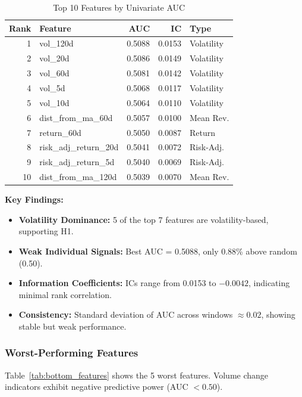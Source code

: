 \documentclass[conference]{IEEEtran}
\begin{document}
\begin{table}[!t]
\caption{Top 10 Features by Univariate AUC}
\label{tab:top_features}
\centering
\begin{tabular}{rlrrl}
\toprule
\textbf{Rank} & \textbf{Feature} & \textbf{AUC} & \textbf{IC} & \textbf{Type} \\
\midrule
1 & vol\_120d & 0.5088 & 0.0153 & Volatility \\
2 & vol\_20d & 0.5086 & 0.0149 & Volatility \\
3 & vol\_60d & 0.5081 & 0.0142 & Volatility \\
4 & vol\_5d & 0.5068 & 0.0117 & Volatility \\
5 & vol\_10d & 0.5064 & 0.0110 & Volatility \\
6 & dist\_from\_ma\_60d & 0.5057 & 0.0100 & Mean Rev. \\
7 & return\_60d & 0.5050 & 0.0087 & Return \\
8 & risk\_adj\_return\_20d & 0.5041 & 0.0072 & Risk-Adj. \\
9 & risk\_adj\_return\_5d & 0.5040 & 0.0069 & Risk-Adj. \\
10 & dist\_from\_ma\_120d & 0.5039 & 0.0070 & Mean Rev. \\
\bottomrule
\end{tabular}
\end{table}

\textbf{Key Findings:}
\begin{itemize}
    \item \textbf{Volatility Dominance:} 5 of the top 7 features are volatility-based, supporting H1.
    \item \textbf{Weak Individual Signals:} Best AUC = 0.5088, only 0.88\% above random (0.50).
    \item \textbf{Information Coefficients:} ICs range from 0.0153 to $-0.0042$, indicating minimal rank correlation.
    \item \textbf{Consistency:} Standard deviation of AUC across windows $\approx 0.02$, showing stable but weak performance.
\end{itemize}

\subsubsection{Worst-Performing Features}
Table~\ref{tab:bottom_features} shows the 5 worst features. Volume change indicators exhibit negative predictive power (AUC $< 0.50$).
\end{document}
